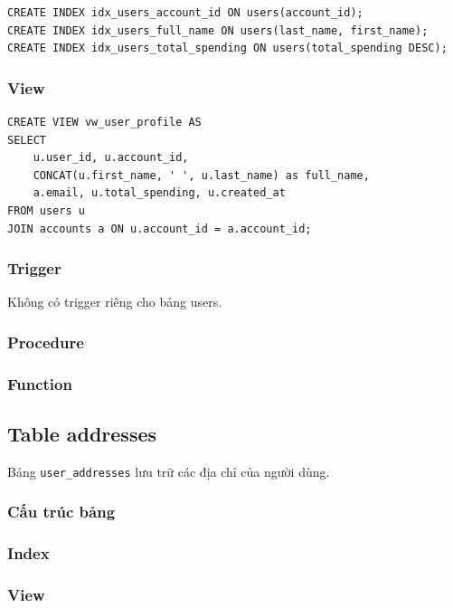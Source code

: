 \begin{verbatim}
CREATE INDEX idx_users_account_id ON users(account_id);
CREATE INDEX idx_users_full_name ON users(last_name, first_name);
CREATE INDEX idx_users_total_spending ON users(total_spending DESC);
\end{verbatim}

\subsubsection{View}

\begin{verbatim}
CREATE VIEW vw_user_profile AS
SELECT 
    u.user_id, u.account_id, 
    CONCAT(u.first_name, ' ', u.last_name) as full_name,
    a.email, u.total_spending, u.created_at
FROM users u
JOIN accounts a ON u.account_id = a.account_id;
\end{verbatim}

\subsubsection{Trigger}

Không có trigger riêng cho bảng users.

\subsubsection{Procedure}

\subsubsection{Function}

\subsection{Table addresses}

Bảng \texttt{user\_addresses} lưu trữ các địa chỉ của người dùng.

\subsubsection{Cấu trúc bảng}

\subsubsection{Index}

\subsubsection{View}

